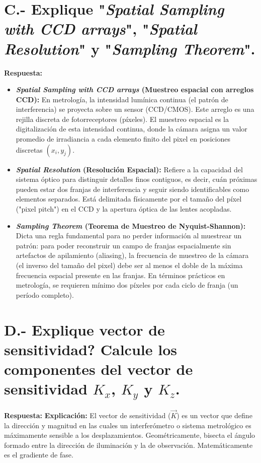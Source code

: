 \documentclass[12pt,letterpaper]{article}
\begin{document}
	\section*{C.- Explique "\textit{Spatial Sampling with CCD arrays}", "\textit{Spatial Resolution}" y "\textit{Sampling Theorem}".}
	
	\textbf{Respuesta:}
	\begin{itemize}
		\item \textbf{\textit{Spatial Sampling with CCD arrays} (Muestreo espacial con arreglos CCD):} En metrología, la intensidad lumínica continua (el patrón de interferencia) se proyecta sobre un sensor (CCD/CMOS). Este arreglo es una rejilla discreta de fotorreceptores (píxeles). El muestreo espacial es la digitalización de esta intensidad continua, donde la cámara asigna un valor promedio de irradiancia a cada elemento finito del pixel en posiciones discretas $(x_i, y_j)$.
		\item \textbf{\textit{Spatial Resolution} (Resolución Espacial):} Refiere a la capacidad del sistema óptico para distinguir detalles finos contiguos, es decir, cuán próximas pueden estar dos franjas de interferencia y seguir siendo identificables como elementos separados. Está delimitada físicamente por el tamaño del píxel ("pixel pitch") en el CCD y la apertura óptica de las lentes acopladas.
		\item \textbf{\textit{Sampling Theorem} (Teorema de Muestreo de Nyquist-Shannon):} Dicta una regla fundamental para no perder información al muestrear un patrón: para poder reconstruir un campo de franjas espacialmente sin artefactos de apilamiento (aliasing), la frecuencia de muestreo de la cámara (el inverso del tamaño del pixel) debe ser al menos el doble de la máxima frecuencia espacial presente en las franjas. En términos prácticos en metrología, se requieren mínimo dos píxeles por cada ciclo de franja (un período completo).
	\end{itemize}
	
	\section*{D.- Explique vector de sensitividad? Calcule los componentes del vector de sensitividad $K_x$, $K_y$ y $K_z$.}
	
	\textbf{Respuesta:}
	\textbf{Explicación:} El vector de sensitividad ($\vec{K}$) es un vector que define la dirección y magnitud en las cuales un interferómetro o sistema metrológico es máximamente sensible a los desplazamientos. Geométricamente, bisecta el ángulo formado entre la dirección de iluminación y la de observación. Matemáticamente es el gradiente de fase.
	
\end{document}

